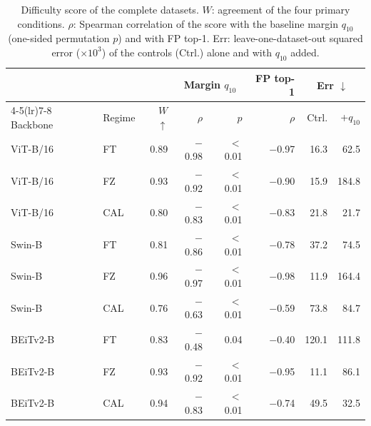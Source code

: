 \begin{table}[t]
\centering
\caption{Difficulty score of the {} complete datasets. $W$: agreement of the four primary conditions. $\rho$: Spearman correlation of the score with the baseline margin $q_{10}$ (one-sided permutation $p$) and with FP top-1. Err: leave-one-dataset-out squared error ($\times 10^{3}$) of the controls (Ctrl.) alone and with $q_{10}$ added.}
\label{tab:gates}
\setlength{\tabcolsep}{1.8pt}
\small
\begin{tabular}{llrrrrrr}
\toprule
 & & & \multicolumn{2}{c}{Margin $q_{10}$} & FP top-1 & \multicolumn{2}{c}{Err $\downarrow$} \\
\cmidrule(lr){4-5}\cmidrule(lr){7-8}
Backbone & Regime & $W$ $\uparrow$ & $\rho$ & $p$ & $\rho$ & Ctrl. & +$q_{10}$ \\
\midrule
ViT-B/16 & FT & 0.89 & $-$0.98 & $<$0.01 & $-$0.97 & 16.3 & 62.5 \\
ViT-B/16 & FZ & 0.93 & $-$0.92 & $<$0.01 & $-$0.90 & 15.9 & 184.8 \\
ViT-B/16 & CAL & 0.80 & $-$0.83 & $<$0.01 & $-$0.83 & 21.8 & 21.7 \\
Swin-B & FT & 0.81 & $-$0.86 & $<$0.01 & $-$0.78 & 37.2 & 74.5 \\
Swin-B & FZ & 0.96 & $-$0.97 & $<$0.01 & $-$0.98 & 11.9 & 164.4 \\
Swin-B & CAL & 0.76 & $-$0.63 & $<$0.01 & $-$0.59 & 73.8 & 84.7 \\
BEiTv2-B & FT & 0.83 & $-$0.48 & 0.04 & $-$0.40 & 120.1 & 111.8 \\
BEiTv2-B & FZ & 0.93 & $-$0.92 & $<$0.01 & $-$0.95 & 11.1 & 86.1 \\
BEiTv2-B & CAL & 0.94 & $-$0.83 & $<$0.01 & $-$0.74 & 49.5 & 32.5 \\
\bottomrule
\end{tabular}
\end{table}
